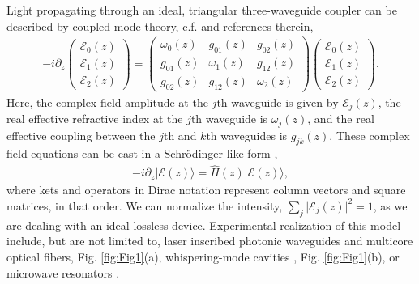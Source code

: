 \documentclass[9pt,twocolumn,twoside]{osajnl}
\begin{document}
Light propagating through an ideal, triangular three-waveguide coupler can be described by coupled mode theory, c.f. \cite{RodriguezLara2015p068014} and references therein,
\begin{eqnarray} \label{eq:CMT}
-i \partial_{z} \left( \begin{array}{c} \mathcal{E}_{0}(z) \\ \mathcal{E}_{1}(z) \\  \mathcal{E}_{2}(z) \end{array} \right) =  \left( \begin{array}{ccc} 
\omega_{0}(z)  & g_{01}(z) & g_{02}(z) \\
g_{01}(z) & \omega_{1}(z) & g_{12}(z) \\
g_{02}(z) & g_{12}(z) & \omega_{2}(z)
\end{array} \right) \left( \begin{array}{c} \mathcal{E}_{0}(z) \\ \mathcal{E}_{1}(z) \\  \mathcal{E}_{2}(z) \end{array} \right).
\end{eqnarray}
Here, the complex field amplitude at the $j$th waveguide is given by $\mathcal{E}_{j}(z)$, the real effective refractive index at the $j$th waveguide is $\omega_{j}(z)$, and the real effective coupling between the $j$th and $k$th waveguides is $g_{jk}(z)$.
These complex field equations can be cast in a Schr\"odinger-like form \cite{RodriguezLara2015p068014},
\begin{eqnarray}
- i \partial_{z} \vert \mathcal{E}(z) \rangle = \hat{H}(z) \vert \mathcal{E}(z) \rangle,\label{eq:SchLike}
\end{eqnarray}
where kets and operators in Dirac notation represent column vectors and square matrices, in that order.
We can normalize the intensity, $\sum_{j} \vert \mathcal{E}_{j}(z) \vert^2 =1$, as we are dealing with an ideal lossless device.
Experimental realization of this model include, but are not limited to, laser inscribed photonic waveguides \cite{Szameit2010p163001} and  multicore optical fibers, Fig. \ref{fig:Fig1}(a), whispering-mode cavities \cite{Peng2014p394}, Fig. \ref{fig:Fig1}(b), or microwave resonators \cite{FrancoVillafane2013p170405}.
\end{document}

